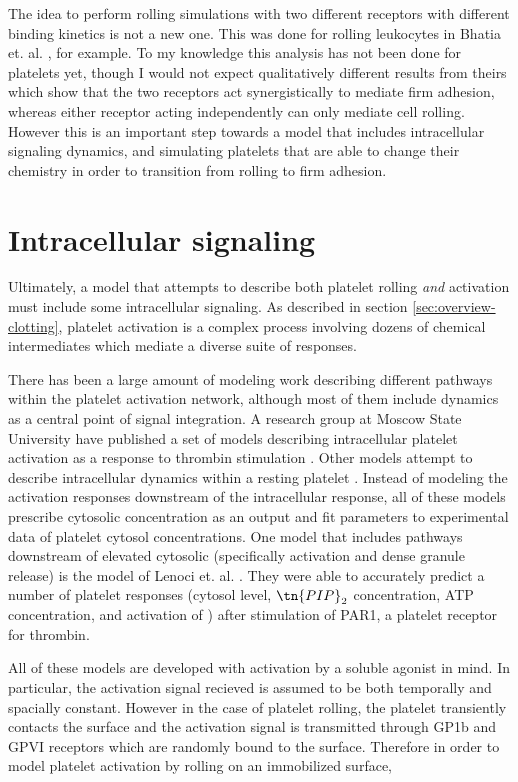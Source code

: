 The idea to perform rolling simulations with two different receptors
with different binding kinetics is not a new one. This was done for
rolling leukocytes in Bhatia et. al. \cite{Bhatia2003}, for
example. To my knowledge this analysis has not been done for platelets
yet, though I would not expect qualitatively different results from
theirs which show that the two receptors act synergistically to
mediate firm adhesion, whereas either receptor acting independently
can only mediate cell rolling. However this is an important step
towards a model that includes intracellular signaling dynamics, and
simulating platelets that are able to change their chemistry in order
to transition from rolling to firm adhesion. 

\section{Intracellular signaling}
\label{sec:intr-sign}

Ultimately, a model that attempts to describe both platelet rolling
\emph{and} activation must include some intracellular signaling. As
described in section \ref{sec:overview-clotting}, platelet activation
is a complex process involving dozens of chemical intermediates which
mediate a diverse suite of responses.

There has been a large amount of modeling work describing different
pathways within the platelet activation network, although most of them
include \Ca dynamics as a central point of signal integration. A
research group at Moscow State University have published a set of
models describing intracellular platelet activation as a response to
thrombin stimulation \cite{Shakhidzhanov2015, Sveshnikova2015,
  Balabin2016, Sveshnikova2016}. Other models attempt to describe
intracellular \Ca dynamics within a resting platelet \cite{Purvis2008,
  Dolan2014}. Instead of modeling the activation responses downstream
of the intracellular \Ca response, all of these models prescribe
cytosolic \Ca concentration as an output and fit parameters to
experimental data of platelet cytosol \Ca concentrations. One model
that includes pathways downstream of elevated cytosolic \Ca
(specifically  activation and dense granule release)
is the model of Lenoci et. al. \cite{Lenoci2011}. They were able to
accurately predict a number of platelet responses (cytosol \Ca level,
$\tn{PIP}_2$ concentration, ATP concentration, and activation of
) after stimulation of PAR1, a platelet receptor for
thrombin.

All of these models are developed with activation by a soluble agonist
in mind. In particular, the activation signal recieved is assumed to
be both temporally and spacially constant. However in the case of
platelet rolling, the platelet transiently contacts the surface and
the activation signal is transmitted through GP1b and GPVI receptors
which are randomly bound to the surface. Therefore in order to model
platelet activation by rolling on an immobilized surface, 


